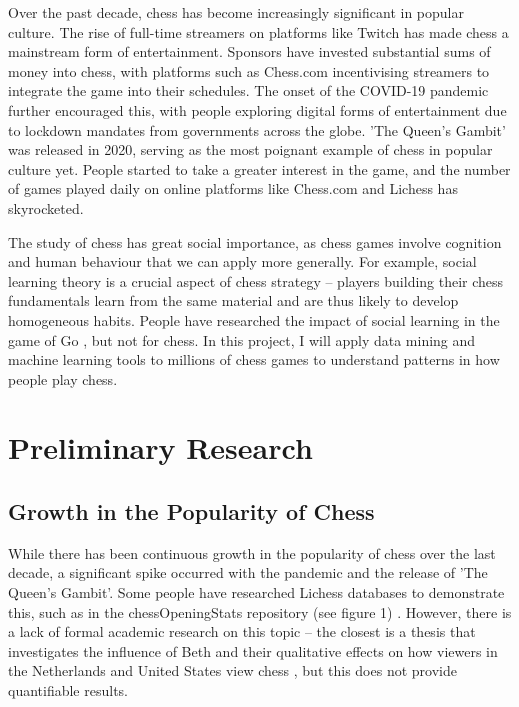 \documentclass[%
 superscriptaddress,
showpacs,preprintnumbers,
 amsmath,
 amssymb,
 aps,
 pra,
showkeys,
onecolumn,
notitlepage,
11pt,
tightenlines      %
]{revtex4-1}
\begin{document}
Over the past decade, chess has become increasingly significant in popular culture. The rise of full-time streamers on platforms like Twitch has made chess a mainstream form of entertainment. Sponsors have invested substantial sums of money into chess, with platforms such as Chess.com incentivising streamers to integrate the game into their schedules. The onset of the COVID-19 pandemic further encouraged this, with people exploring digital forms of entertainment due to lockdown mandates from governments across the globe. 'The Queen's Gambit' was released in 2020, serving as the most poignant example of chess in popular culture yet. People started to take a greater interest in the game, and the number of games played daily on online platforms like Chess.com and Lichess has skyrocketed. 

The study of chess has great social importance, as chess games involve cognition and human behaviour that we can apply more generally. For example, social learning theory is a crucial aspect of chess strategy -- players building their chess fundamentals learn from the same material and are thus likely to develop homogeneous habits. People have researched the impact of social learning in the game of Go \cite{beheim2014strategic}, but not for chess. In this project, I will apply data mining and machine learning tools to millions of chess games to understand patterns in how people play chess.

\section{Preliminary Research}
\subsection{Growth in the Popularity of Chess}
While there has been continuous growth in the popularity of chess over the last decade, a significant spike occurred with the pandemic and the release of 'The Queen's Gambit'. Some people have researched Lichess databases to demonstrate this, such as in the chessOpeningStats repository (see figure 1) \cite{chessOpeningStats}. However, there is a lack of formal academic research on this topic -- the closest is a thesis that investigates the influence of Beth and their qualitative effects on how viewers in the Netherlands and United States view chess \cite{lowie2021big}, but this does not provide quantifiable results.
\end{document}
